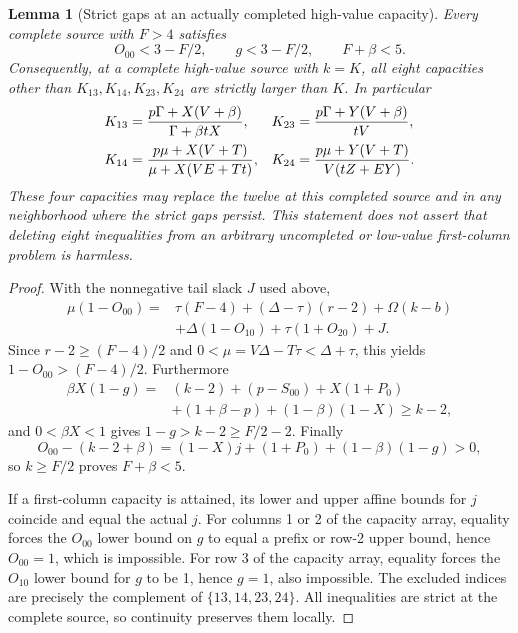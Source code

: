 \documentclass[11pt,reqno]{amsart}
\newtheorem{lemma}[theorem]{Lemma}
\theoremstyle{definition}
\theoremstyle{remark}
\begin{document}
\begin{lemma}[Strict gaps at an actually completed high-value capacity]
\label{s3:cc-strict-gap}
Every complete source with \(F>4\) satisfies
\[
 O_{00}<3-F/2,\qquad g<3-F/2,\qquad F+\beta<5.
\]
Consequently, at a complete high-value source with \(k=K\), all
eight capacities other than \(K_{13},K_{14},K_{23},K_{24}\)
are strictly larger than \(K\). In particular
\begin{align*}
 K_{13}&={p\Gamma+X(V+\beta)\over\Gamma+\beta tX},&
 K_{23}&={p\Gamma+Y(V+\beta)\over tV},\\
 K_{14}&={p\mu+X(V+T)\over\mu+X(VE+Tt)},&
 K_{24}&={p\mu+Y(V+T)\over V(tZ+EY)}.
\end{align*}
These four capacities may replace the twelve at this completed source
and in any neighborhood where the strict gaps persist. This statement
does not assert that deleting eight inequalities from an arbitrary
uncompleted or low-value first-column problem is harmless.
\end{lemma}
\begin{proof}
With the nonnegative tail slack \(J\) used above,
\begin{align*}
 \mu(1-O_{00})={}&\tau(F-4)+(\Delta-\tau)(r-2)
       +\Omega(k-b)\\
       &+\Delta(1-O_{10})+\tau(1+O_{20})+J.
\end{align*}
Since \(r-2\ge(F-4)/2\) and
\(0<\mu=V\Delta-T\tau<\Delta+\tau\), this yields
\(1-O_{00}>(F-4)/2\). Furthermore
\begin{align*}
 \beta X(1-g)={}&(k-2)+(p-S_{00})+X(1+P_0)\\
 &+(1+\beta-p)+(1-\beta)(1-X)\ge k-2,
\end{align*}
and \(0<\beta X<1\) gives \(1-g>k-2\ge F/2-2\).
Finally
\[
 O_{00}-(k-2+\beta)
 =(1-X)j+(1+P_0)+(1-\beta)(1-g)>0,
\]
so \(k\ge F/2\) proves \(F+\beta<5\).

If a first-column capacity is attained, its lower and upper affine
bounds for \(j\) coincide and equal the actual \(j\).
For columns 1 or 2 of the capacity array, equality forces the
\(O_{00}\) lower bound on \(g\) to equal a prefix or row-2
upper bound, hence \(O_{00}=1\), which is impossible.
For row 3 of the capacity array, equality forces the \(O_{10}\)
lower bound for \(g\) to be 1, hence \(g=1\), also impossible.
The excluded indices are precisely the complement of
\(\{13,14,23,24\}\). All inequalities are strict at the complete
source, so continuity preserves them locally.
\end{proof}
\end{document}
